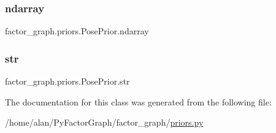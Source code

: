 \subsubsection{\texorpdfstring{ndarray}{ndarray}}
{\footnotesize\ttfamily factor\+\_\+graph.\+priors.\+Pose\+Prior.\+ndarray\hspace{0.3cm}{\ttfamily [static]}}

\mbox{\label{classfactor__graph_1_1priors_1_1PosePrior_a4f7e81f86b1d3aa2368ffa3080cd196f}}
\subsubsection{\texorpdfstring{str}{str}}
{\footnotesize\ttfamily factor\+\_\+graph.\+priors.\+Pose\+Prior.\+str\hspace{0.3cm}{\ttfamily [static]}}



The documentation for this class was generated from the following file\+:\begin{DoxyCompactItemize}
\item
/home/alan/\+Py\+Factor\+Graph/factor\+\_\+graph/\hyperlink{priors_8py}{priors.\+py}\end{DoxyCompactItemize}
